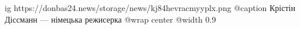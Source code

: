  
 
 
 
 

\ifcmt
  ig https://donbas24.news/storage/news/kj84hevracmyyplx.png
	@caption Крістін Діссманн — німецька режисерка
  @wrap center
  @width 0.9
\fi
